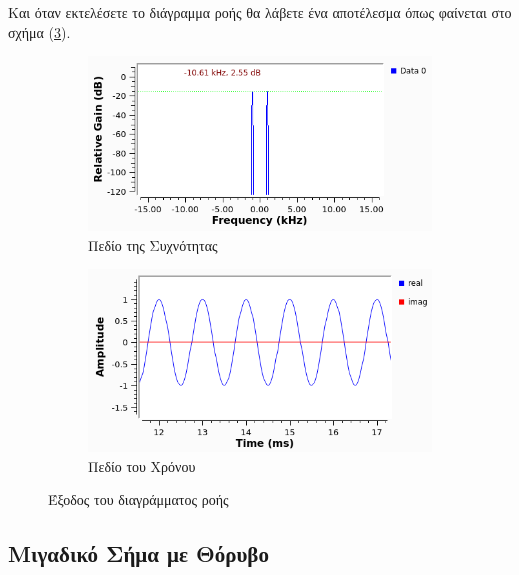 \documentclass[12pt]{report}
\begin{document}
            Και όταν εκτελέσετε το διάγραμμα ροής θα λάβετε ένα αποτέλεσμα όπως φαίνεται στο 
            σχήμα (\ref{img:ex1}).
            \begin{figure}[h]
                \centering
                \begin{subfigure}{0.45\linewidth}
                    \includegraphics[width=\linewidth]{ex1_freq.png}
                    \caption{Πεδίο της Συχνότητας}
                    \label{img:ex1Freq}
                \end{subfigure}
                \begin{subfigure}{0.45\linewidth}
                    \includegraphics[width=\linewidth]{ex1_time.png}
                    \caption{Πεδίο του Χρόνου}
                    \label{img:ex1Time}
                \end{subfigure}

                \caption{Έξοδος του διαγράμματος ροής}
                \label{img:ex1}
            \end{figure}
        
        \subsection{\textsf{Μιγαδικό Σήμα με Θόρυβο}}
\end{document}
